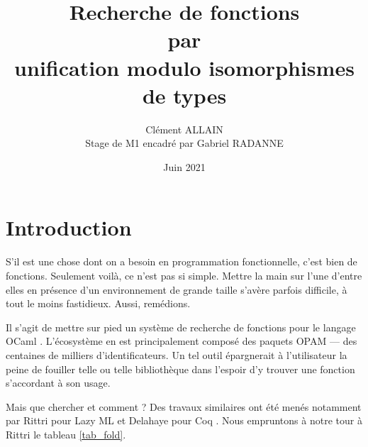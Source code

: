 \documentclass[a4paper]{report}
\title{Recherche de fonctions \\ par \\ unification modulo isomorphismes de types}
\author{Clément ALLAIN \\ Stage de M1 encadré par Gabriel RADANNE}
\date{Juin 2021}
\theoremstyle{definition}
\begin{document}
\maketitle

\tableofcontents

\newpage


\chapter{Introduction}

S'il est une chose dont on a besoin en programmation fonctionnelle, c'est bien de fonctions. Seulement voilà, ce n'est pas si simple. Mettre la main sur l'une d'entre elles en présence d'un environnement de grande taille s'avère parfois difficile, à tout le moins fastidieux. Aussi, remédions.

Il s'agit de mettre sur pied un système de recherche de fonctions pour le langage OCaml \cite{OCaml}. L'écosystème en est principalement composé des paquets OPAM --- des centaines de milliers d'identificateurs. Un tel outil épargnerait à l'utilisateur la peine de fouiller telle ou telle bibliothèque dans l'espoir d'y trouver une fonction s'accordant à son usage.

Mais que chercher et comment ? Des travaux similaires ont été menés notamment par Rittri pour Lazy ML \cite{Rittri91, Rittri93} et Delahaye pour Coq \cite{Delahaye}. Nous empruntons à notre tour à Rittri \cite{Rittri91} le tableau \ref{tab_fold}.
\end{document}
